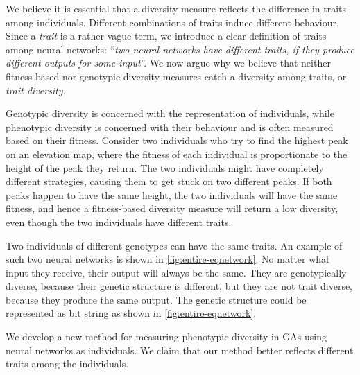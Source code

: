 We believe it is essential that a diversity measure reflects the difference in traits among individuals. Different combinations of traits induce different behaviour. Since a \emph{trait} is a rather vague term, we introduce a clear definition of traits among neural networks: ``\emph{two neural networks have different traits, if they produce different outputs for some input}''. We now argue why we believe that neither fitness-based nor genotypic diversity measures catch a diversity among traits, or \emph{trait diversity}.

Genotypic diversity is concerned with the representation of individuals, while phenotypic diversity is concerned with their behaviour and is often measured based on their fitness. Consider two individuals who try to find the highest peak on an elevation map, where the fitness of each individual is proportionate to the height of the peak they return. The two individuals might have completely different strategies, causing them to get stuck on two different peaks. If both peaks happen to have the same height, the two individuals will have the same fitness, and hence a fitness-based diversity measure will return a low diversity, even though the two individuals have different traits.

Two individuals of different genotypes can have the same traits. An example of such two neural networks is shown in \cref{fig:entire-eqnetwork}. No matter what input they receive, their output will always be the same. They are genotypically diverse, because their genetic structure is different, but they are not trait diverse, because they produce the same output. The genetic structure could be represented as bit string as shown in \cref{fig:entire-eqnetwork}.
%

%
We develop a new method for measuring phenotypic diversity in GAs using neural networks as individuals. We claim that our method better reflects different traits among the individuals.

